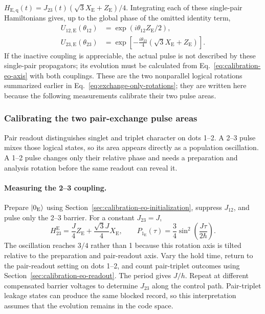 $H_{\mathrm{E,q}}(t)=J_{23}(t)(\sqrt3X_{\mathrm E}+Z_{\mathrm E})/4$.
Integrating each of these single-pair Hamiltonians gives, up to
the global phase of the omitted identity term,
\begin{equation}
 \begin{aligned}
 U_{12,\mathrm E}(\theta_{12})
  &=\exp(i\theta_{12}Z_{\mathrm E}/2),\\
 U_{23,\mathrm E}(\theta_{23})
  &=\exp\!\left[-\frac{i\theta_{23}}4
       (\sqrt3X_{\mathrm E}+Z_{\mathrm E})\right].
 \end{aligned}
 \label{eq:calibration-eo-propagators}
\end{equation}
If the inactive coupling is appreciable, the actual pulse is not
described by these single-pair propagators; its evolution must be
calculated from Eq.~\eqref{eq:calibration-eo-axis} with both couplings.
These are the two nonparallel logical rotations summarized earlier
in Eq.~\eqref{eq:exchange-only-rotations}; they are written here
because the following measurements calibrate their two pulse areas.

\subsubsection{Calibrating the two pair-exchange pulse areas}
\label{sec:calibration-eo-pulse-areas}

Pair readout distinguishes singlet and triplet character on dots
1--2. A 2--3 pulse mixes those logical states, so its area appears
directly as a population oscillation. A 1--2 pulse changes only
their relative phase and needs a preparation and analysis rotation
before the same readout can reveal it.

\paragraph{Measuring the 2--3 coupling.}
Prepare $\lvert 0_{\mathrm E}\rangle$ using
Section~\ref{sec:calibration-eo-initialization}, suppress $J_{12}$,
and pulse only the 2--3 barrier. For a constant $J_{23}=J$,
\begin{equation}
 H_{23}^{\mathrm E}=\frac J4Z_{\mathrm E}
                   +\frac{\sqrt3J}{4}X_{\mathrm E},\qquad
 P_{1_{\mathrm E}}(\tau)=\frac34
                    \sin^2\!\left(\frac{J\tau}{2\hbar}\right).
 \label{eq:measurement-eo-oscillations}
\end{equation}
The oscillation reaches $3/4$ rather than 1 because this rotation
axis is tilted relative to the preparation and pair-readout axis.
Vary the hold time, return to the pair-readout setting on dots
1--2, and count pair-triplet outcomes using
Section~\ref{sec:calibration-eo-readout}. The period gives $J/h$.
Repeat at different compensated barrier voltages to determine
$J_{23}$ along the control path. Pair-triplet leakage states can
produce the same blocked record, so this interpretation assumes
that the evolution remains in the code space.

